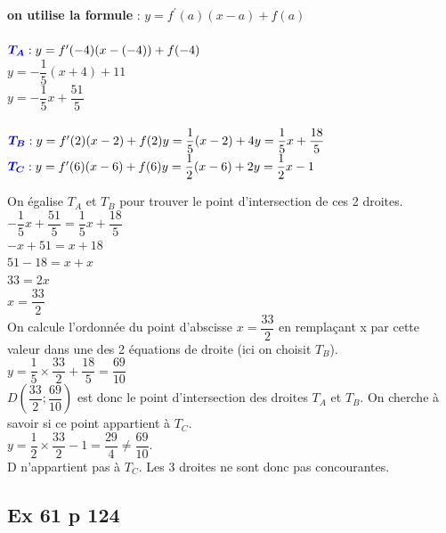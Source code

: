 \documentclass[12pt,a4paper]{book}
\begin{document}
\begin{enumMet}
    \item \textbf{on utilise la formule} : $y=f^{\prime}(a)(x-a)+f(a)$\\
    \ \\
    $\mBleu{T_{A}}: y=f^{\prime}(-4)(x-(-4))+f(-4)$\\
    $y=-\dfrac{1}{5}(x+4)+11$\\
    $y=-\dfrac{1}{5} x+\dfrac{51}{5}$\\
    \ \\
    $\mBleu{T_{B}}: y=f^{\prime}(2)(x-2)+f(2) \\ y=\dfrac{1}{5}(x-2)+4 \\ y=\dfrac{1}{5} x+\dfrac{18}{5} \\$
    \ \\
    $\mBleu{T_{C}}: y=f^{\prime}(6)(x-6)+f(6) \\ y=\dfrac{1}{2}(x-6)+2 \\ y=\dfrac{1}{2} x-1$
    \item On égalise $T_{A}$ et $T_{B}$ pour trouver le point d'intersection de ces 2 droites.\\
    $-\dfrac{1}{5} x+\dfrac{51}{5}=\dfrac{1}{5} x+\dfrac{18}{5}$\\
    $-x+51=x+18$\\
    $51-18=x+x$\\
    $33=2 x$\\
    $x=\dfrac{33}{2}$\\
    On calcule l'ordonnée du point d'abscisse $x=\dfrac{33}{2}$ en remplaçant x par cette valeur dans une des 2 équations de droite (ici on choisit $T_B$).\\
    $y=\dfrac{1}{5}\times\dfrac{33}{2}+\dfrac{18}{5}=\dfrac{69}{10}$\\
    $D\left(\dfrac{33}{2};\dfrac{69}{10}\right)$ est donc le point d'intersection des droites $T_{A}$ et $T_{B}$. On cherche à savoir si ce point appartient à $T_C$.\\
    $y=\dfrac{1}{2}\times\dfrac{33}{2}-1=\dfrac{29}{4}\neq\dfrac{69}{10}$.\\
    D n'appartient pas à $T_C$. Les 3 droites ne sont donc pas concourantes.
\end{enumMet}



\subsection*{Ex 61 p 124}
\end{document}
